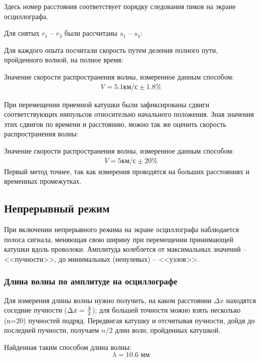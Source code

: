 Здесь номер расстояния соответствует порядку следования пиков на экране осциллографа. 

Для снятых $r_1$ -- $r_3$ были рассчитаны $s_1$ -- $s_4$:



Для каждого опыта посчитали скорость путем деления полного пути, пройденного волной, на полное время:




Значение скорости распространения волны, измеренное данным способом:
\begin{gather*}
	V=5.1\text{км/с}\pm1.8\%
\end{gather*}


При перемещении приемной катушки были зафиксированы сдвиги соответствующих импульсов относительно начального положения. Зная значения этих сдвигов по времени и расстоянию, можно так же оценить скорость распространения волны:



Значение скорости распространения волны, измеренное данным способом:
\begin{gather*}
	V=5\text{км/с}\pm20\%
\end{gather*}
Первый метод точнее, так как измерения проводятся на больших расстояниях и временных промежутках.

\subsection{Непрерывный режим}

При включении непрерывного режима на экране осциллографа наблюдается полоса сигнала, меняющая свою ширину при перемещении принимающей катушки вдоль проволоки. Амплитуда колеблется от максимальных значений – <<пучности>>, до минимальных (ненулевых) – <<узлов>>. 

\subsubsection{Длина волны по амплитуде на осциллографе}

Для измерения длины волны нужно получить, на каком расстоянии $\Delta x$ находятся соседние пучности ($\Delta x = {\lambda\over2}$); для большей точности можно взять несколько (n=20) пучностей подряд. Передвигая катушку и отсчитывая пучности, дойдя до последней пучности, получаем $n/2$ длин волн, пройденных катушкой.

Найденная таким способом длина волны:
\begin{equation}
	\lambda=10.6 \text{ мм}
\end{equation}



